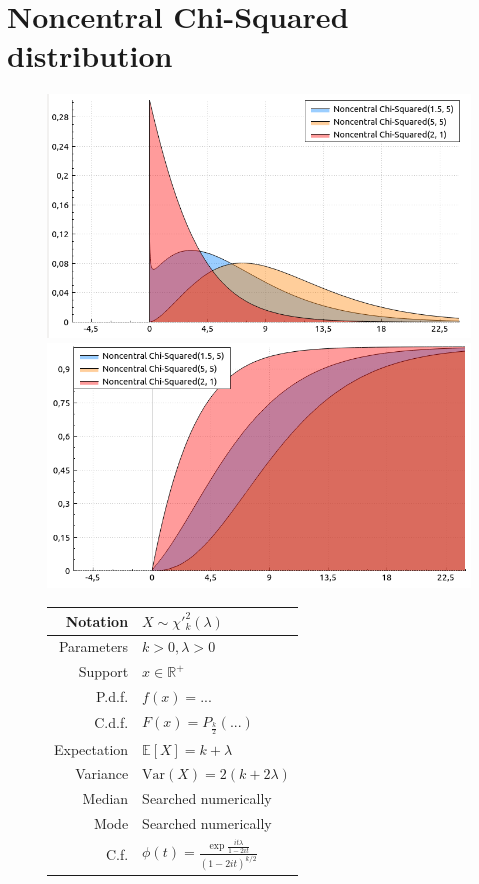 \documentclass[a4paper,11pt]{article}
\theoremstyle{plain}
\theoremstyle{definition}
\newcommand{\ME}{\mathbb{E}}
\newcommand{\MR}{\mathbb{R}}
\newcommand{\Var}{\mathrm{Var}}
\begin{document}
	\section{Noncentral Chi-Squared distribution}
	\begin{figure}[!htb]\centering
	\begin{minipage}{0.55\textwidth}
		\includegraphics[width=\linewidth, right]{noncentral_chi-squared_pdf}
		\captionsetup{labelformat=empty}
		\includegraphics[width=\linewidth, right]{noncentral_chi-squared_cdf}
		\captionsetup{labelformat=empty}
	\end{minipage}
	\begin{minipage}{0.4\textwidth}
		\begin{tabular}{| r | l |}
			\hline
			Notation & $X \sim \chi'^2_k(\lambda)$ \\
			\hline
			Parameters & $k > 0, \lambda > 0$ \\
			\hline
			Support & $x \in \MR^+$  \\
			\hline
			P.d.f. & $f(x) = ...  $ \\
			\hline
			C.d.f. & $F(x)=P_{\frac{k}{2}}(...) $\\
			\hline
			Expectation & $\ME[X] = k + \lambda$ \\
			\hline
			Variance & $\Var(X) =2(k+2\lambda)$ \\
			\hline
			Median & Searched numerically \\
			\hline
			Mode & Searched numerically \\
			\hline
			C.f. & $\phi(t) = \frac{\exp{\frac{it\lambda}{1-2it}}}{(1-2it)^{k/2}}$ \\
			\hline
		\end{tabular}
	\end{minipage}
    \end{figure}
	
\end{document}

